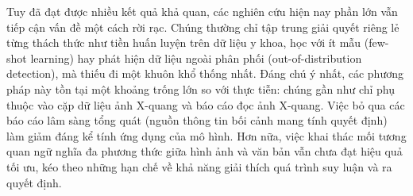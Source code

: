 Tuy đã đạt được nhiều kết quả khả quan, các nghiên cứu hiện nay phần lớn vẫn tiếp cận vấn đề một cách rời rạc. Chúng thường chỉ tập trung giải quyết riêng lẻ từng thách thức như tiền huấn luyện trên dữ liệu y khoa, học với ít mẫu (few-shot learning) hay phát hiện dữ liệu ngoài phân phối (out-of-distribution detection), mà thiếu đi một khuôn khổ thống nhất. Đáng chú ý nhất, các phương pháp này tồn tại một khoảng trống lớn so với thực tiễn: chúng gần như chỉ phụ thuộc vào cặp dữ liệu ảnh X-quang và báo cáo đọc ảnh X-quang. Việc bỏ qua các báo cáo lâm sàng tổng quát (nguồn thông tin bối cảnh mang tính quyết định) làm giảm đáng kể tính ứng dụng của mô hình. Hơn nữa, việc khai thác mối tương quan ngữ nghĩa đa phương thức giữa hình ảnh và văn bản vẫn chưa đạt hiệu quả tối ưu, kéo theo những hạn chế về khả năng giải thích quá trình suy luận và ra quyết định.




